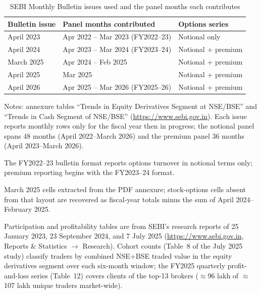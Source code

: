 \documentclass[12pt]{article}
\begin{document}
\begin{table}[H]
\centering
\small
\caption{SEBI Monthly Bulletin issues used and the panel months each
contributes}
\label{tab:bulletins}
\begin{threeparttable}
\begin{tabular}{lll}
\toprule
Bulletin issue & Panel months contributed & Options series \\
\midrule
April 2023 & Apr 2022 -- Mar 2023 (FY2022--23) & Notional only\tnote{a} \\
April 2024 & Apr 2023 -- Mar 2024 (FY2023--24) & Notional + premium \\
March 2025 & Apr 2024 -- Feb 2025 & Notional + premium \\
April 2025 & Mar 2025\tnote{b} & Notional + premium \\
April 2026 & Apr 2025 -- Mar 2026 (FY2025--26) & Notional + premium \\
\bottomrule
\end{tabular}
\begin{tablenotes}\footnotesize
\item Notes: annexure tables ``Trends in Equity Derivatives Segment at
NSE/BSE'' and ``Trends in Cash Segment of NSE/BSE''
(\url{https://www.sebi.gov.in}). Each issue reports monthly rows only for the
fiscal year then in progress; the notional panel spans 48 months (April
2022--March 2026) and the premium panel 36 months (April 2023--March 2026).
\item[a] The FY2022--23 bulletin format reports options turnover in notional
terms only; premium reporting begins with the FY2023--24 format.
\item[b] March 2025 cells extracted from the PDF annexure; stock-options
cells absent from that layout are recovered as fiscal-year totals minus the
sum of April 2024--February 2025.
\end{tablenotes}
\end{threeparttable}
\end{table}

Participation and profitability tables are from SEBI's research reports of
25 January 2023, 23 September 2024, and 7 July 2025
(\url{https://www.sebi.gov.in}, Reports \& Statistics $\rightarrow$
Research). Cohort counts (Table~8 of the July 2025 study) classify traders
by combined NSE+BSE traded value in the equity derivatives segment over
each six-month window; the FY2025 quarterly profit-and-loss series
(Table~12) covers clients of the top-13 brokers ($\approx$96 lakh of
$\approx$107 lakh unique traders market-wide).
\end{document}
